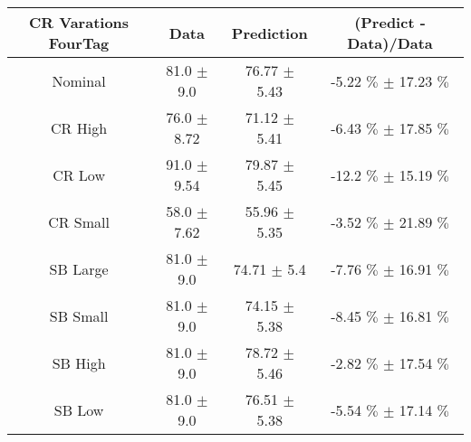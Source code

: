 \begin{footnotesize} 
\begin{tabular}{c|c|c|c} 
CR Varations FourTag & Data & Prediction & (Predict - Data)/Data \\ 
\hline\hline 
Nominal & 81.0 $\pm$ 9.0 & 76.77 $\pm$ 5.43 & -5.22 $\%$  $\pm$ 17.23 $\%$ \\ 
\hline 
CR High & 76.0 $\pm$ 8.72 & 71.12 $\pm$ 5.41 & -6.43 $\%$  $\pm$ 17.85 $\%$ \\ 
\hline 
CR Low & 91.0 $\pm$ 9.54 & 79.87 $\pm$ 5.45 & -12.2 $\%$  $\pm$ 15.19 $\%$ \\ 
\hline 
CR Small & 58.0 $\pm$ 7.62 & 55.96 $\pm$ 5.35 & -3.52 $\%$  $\pm$ 21.89 $\%$ \\ 
\hline 
SB Large & 81.0 $\pm$ 9.0 & 74.71 $\pm$ 5.4 & -7.76 $\%$  $\pm$ 16.91 $\%$ \\ 
\hline 
SB Small & 81.0 $\pm$ 9.0 & 74.15 $\pm$ 5.38 & -8.45 $\%$  $\pm$ 16.81 $\%$ \\ 
\hline 
SB High & 81.0 $\pm$ 9.0 & 78.72 $\pm$ 5.46 & -2.82 $\%$  $\pm$ 17.54 $\%$ \\ 
\hline 
SB Low & 81.0 $\pm$ 9.0 & 76.51 $\pm$ 5.38 & -5.54 $\%$  $\pm$ 17.14 $\%$ \\ 
\hline\hline 
\end{tabular} 
\end{footnotesize} 
\newline 
